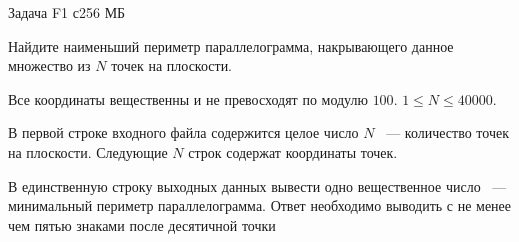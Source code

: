 \begin{problem}{Задача F}{1 с}{256 МБ}

Найдите наименьший периметр параллелограмма, накрывающего
данное множество из $N$ точек на плоскости.
\Limit

Все координаты вещественны и не превосходят по модулю $100$.
$1 \le N \le 40000$.

\InputFile
В первой строке входного файла содержится целое число $N$ ~---
количество точек на плоскости. Следующие $N$ строк содержат координаты
точек.

\OutputFile
В единственную строку выходных данных вывести одно вещественное число ~---
минимальный периметр параллелограмма. Ответ необходимо
выводить с не менее чем пятью знаками после десятичной точки

\Example
\begin{example}
\end{example}
\end{problem}
